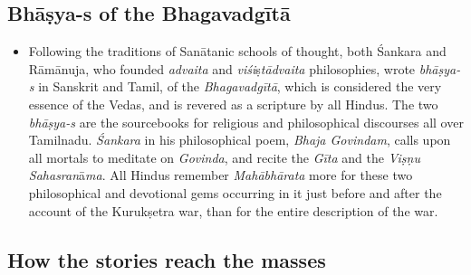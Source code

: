 \subsection*{Bhāṣya-s of the Bhagavadgītā}

\begin{itemize}
\item Following the traditions of Sanātanic schools of thought, both Śankara and Rāmānuja, who founded \textit{advaita} and \textit{viśi}ṣ\textit{tādvaita} philosophies, wrote \textit{bhāṣya-s} in Sanskrit and Tamil, of the \textit{Bhagavadgītā}, which is considered the very essence of the Vedas, and is revered as a scripture by all Hindus. The two \textit{bhāṣya-s} are the sourcebooks for religious and philosophical discourses all over Tamilnadu. \textit{Śankara} in his philosophical poem, \textit{Bhaja Govindam}, calls upon all mortals to meditate on \textit{Govinda}, and recite the \textit{Gīta} and the \textit{Viṣṇu Sahasran}ā\textit{ma}. All Hindus remember \textit{Mahābhārata} more for these two philosophical and devotional gems occurring in it just before and after the account of the Kurukṣetra war, than for the entire description of the war.

\end{itemize}


\subsection*{How the stories reach the masses}

